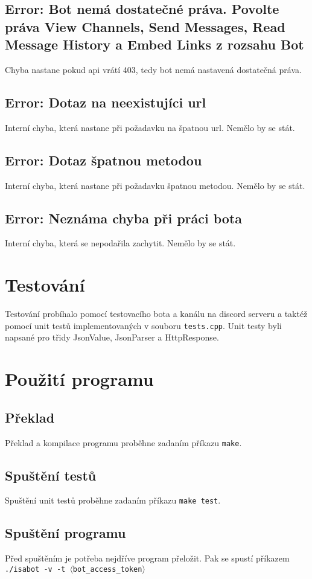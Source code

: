 \documentclass[a4paper,11pt]{article}
\begin{document}
\subsection{Error: Bot nemá dostatečné práva. Povolte práva View Channels, Send Messages, Read Message History a Embed Links z rozsahu Bot}
Chyba nastane pokud api vrátí 403, tedy bot nemá nastavená dostatečná práva.

\subsection{Error: Dotaz na neexistujíci url}
Interní chyba, která nastane při požadavku na špatnou url. Nemělo by se stát.

\subsection{Error: Dotaz špatnou metodou}
Interní chyba, která nastane při požadavku špatnou metodou. Nemělo by se stát.

\subsection{Error: Neznáma chyba při práci bota}
Interní chyba, která se nepodařila zachytit. Nemělo by se stát.

\section{Testování}
Testování probíhalo pomocí testovacího bota a kanálu na discord serveru a taktéž pomocí unit testů implementovaných v souboru \texttt{tests.cpp}. Unit testy byli napsané pro třidy JsonValue, JsonParser a HttpResponse.

\section{Použití programu}
\subsection{Překlad}
Překlad a kompilace programu proběhne zadaním příkazu \texttt{make}.

\subsection{Spuštění testů}
Spuštění unit testů proběhne zadaním příkazu \texttt{make test}.

\subsection{Spuštění programu}
Před spuštěním je potřeba nejdříve program přeložit. Pak se spustí příkazem \texttt{./isabot -v -t $\langle$bot\_access\_token$\rangle$}
\end{document}

